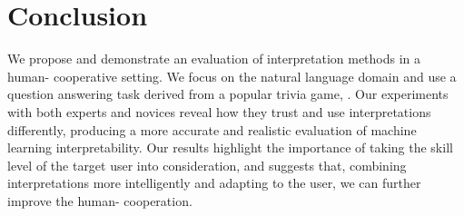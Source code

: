 \section{Conclusion}
\label{sec:conclusion}

We propose and demonstrate an evaluation of interpretation methods in a
human- cooperative setting. We focus on the natural language
domain and use a question answering task derived from a popular trivia
game, \qb{}.
Our experiments with both experts and novices reveal how they trust and
use interpretations differently, producing a more accurate and
realistic evaluation of machine learning interpretability. Our results
highlight the importance of taking the skill level of the target user
into consideration, and suggests that, combining
interpretations more intelligently and adapting to the user, we can
further improve the human- cooperation.
